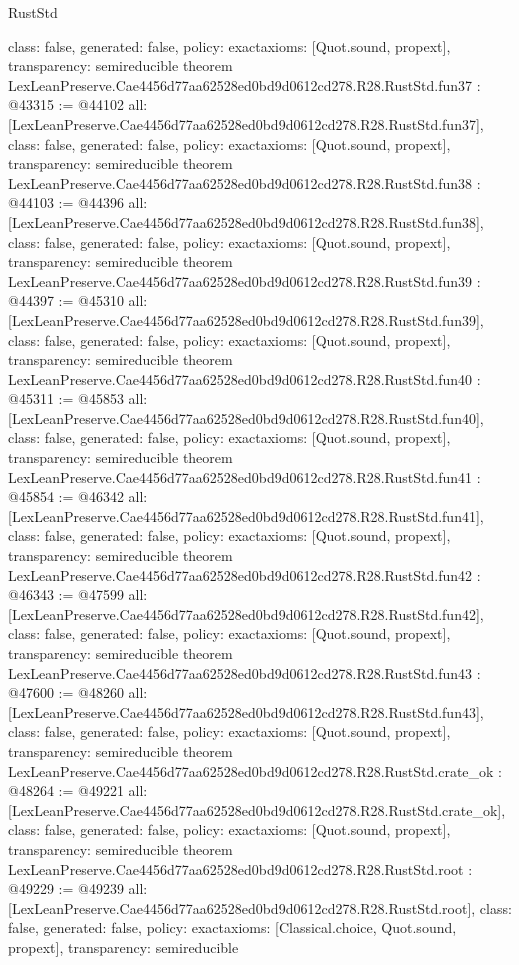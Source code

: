 \begin{lexlean}{RustStd}
\begin{coremodule}
{  class: false,
  generated: false,
  policy: exact{axioms: [Quot.sound, propext]},
  transparency: semireducible
}
theorem LexLeanPreserve.Cae4456d77aa62528ed0bd9d0612cd278.R28.RustStd.fun37 : @43315 := @44102 {
  all: [LexLeanPreserve.Cae4456d77aa62528ed0bd9d0612cd278.R28.RustStd.fun37],
  class: false,
  generated: false,
  policy: exact{axioms: [Quot.sound, propext]},
  transparency: semireducible
}
theorem LexLeanPreserve.Cae4456d77aa62528ed0bd9d0612cd278.R28.RustStd.fun38 : @44103 := @44396 {
  all: [LexLeanPreserve.Cae4456d77aa62528ed0bd9d0612cd278.R28.RustStd.fun38],
  class: false,
  generated: false,
  policy: exact{axioms: [Quot.sound, propext]},
  transparency: semireducible
}
theorem LexLeanPreserve.Cae4456d77aa62528ed0bd9d0612cd278.R28.RustStd.fun39 : @44397 := @45310 {
  all: [LexLeanPreserve.Cae4456d77aa62528ed0bd9d0612cd278.R28.RustStd.fun39],
  class: false,
  generated: false,
  policy: exact{axioms: [Quot.sound, propext]},
  transparency: semireducible
}
theorem LexLeanPreserve.Cae4456d77aa62528ed0bd9d0612cd278.R28.RustStd.fun40 : @45311 := @45853 {
  all: [LexLeanPreserve.Cae4456d77aa62528ed0bd9d0612cd278.R28.RustStd.fun40],
  class: false,
  generated: false,
  policy: exact{axioms: [Quot.sound, propext]},
  transparency: semireducible
}
theorem LexLeanPreserve.Cae4456d77aa62528ed0bd9d0612cd278.R28.RustStd.fun41 : @45854 := @46342 {
  all: [LexLeanPreserve.Cae4456d77aa62528ed0bd9d0612cd278.R28.RustStd.fun41],
  class: false,
  generated: false,
  policy: exact{axioms: [Quot.sound, propext]},
  transparency: semireducible
}
theorem LexLeanPreserve.Cae4456d77aa62528ed0bd9d0612cd278.R28.RustStd.fun42 : @46343 := @47599 {
  all: [LexLeanPreserve.Cae4456d77aa62528ed0bd9d0612cd278.R28.RustStd.fun42],
  class: false,
  generated: false,
  policy: exact{axioms: [Quot.sound, propext]},
  transparency: semireducible
}
theorem LexLeanPreserve.Cae4456d77aa62528ed0bd9d0612cd278.R28.RustStd.fun43 : @47600 := @48260 {
  all: [LexLeanPreserve.Cae4456d77aa62528ed0bd9d0612cd278.R28.RustStd.fun43],
  class: false,
  generated: false,
  policy: exact{axioms: [Quot.sound, propext]},
  transparency: semireducible
}
theorem LexLeanPreserve.Cae4456d77aa62528ed0bd9d0612cd278.R28.RustStd.crate_ok : @48264 := @49221 {
  all: [LexLeanPreserve.Cae4456d77aa62528ed0bd9d0612cd278.R28.RustStd.crate_ok],
  class: false,
  generated: false,
  policy: exact{axioms: [Quot.sound, propext]},
  transparency: semireducible
}
theorem LexLeanPreserve.Cae4456d77aa62528ed0bd9d0612cd278.R28.RustStd.root : @49229 := @49239 {
  all: [LexLeanPreserve.Cae4456d77aa62528ed0bd9d0612cd278.R28.RustStd.root],
  class: false,
  generated: false,
  policy: exact{axioms: [Classical.choice, Quot.sound, propext]},
  transparency: semireducible
}


\end{coremodule}
\end{lexlean}
